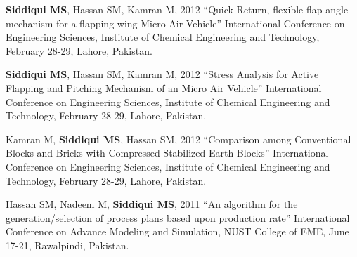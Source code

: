 \begin{cventries}
{\begin{cvitems}
               \item{\textbf{Siddiqui MS}, Hassan SM, Kamran M, 2012 “Quick Return, flexible flap angle mechanism for a flapping wing Micro Air Vehicle” International Conference on Engineering Sciences, Institute of Chemical Engineering and Technology, February 28-29, Lahore, Pakistan.}
               \item{\textbf{Siddiqui MS}, Hassan SM, Kamran M, 2012 “Stress Analysis for Active Flapping and Pitching Mechanism of an Micro Air Vehicle” International Conference on Engineering Sciences, Institute of Chemical Engineering and Technology, February 28-29, Lahore, Pakistan.}
               \item{Kamran M, \textbf{Siddiqui MS}, Hassan SM, 2012 “Comparison among Conventional Blocks and Bricks with Compressed Stabilized Earth Blocks” International Conference on Engineering Sciences, Institute of Chemical Engineering and Technology, February 28-29, Lahore, Pakistan.}
               \item{Hassan SM, Nadeem M, \textbf{Siddiqui MS}, 2011 “An algorithm for the generation/selection of process plans based upon production rate” International Conference on Advance Modeling and Simulation, NUST College of EME, June 17-21, Rawalpindi, Pakistan.}    
      \end{cvitems}
    }
\end{cventries}